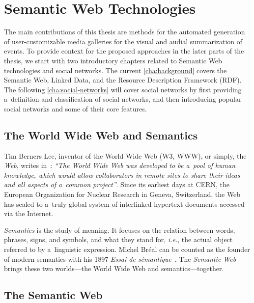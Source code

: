 \chapter{Semantic Web Technologies}
\label{cha:background}

\ifpdf
    \graphicspath{{2_background/figures/PNG/}{2_background/figures/PDF/}{2_background/figures/}}
\else
    \graphicspath{{2_background/figures/EPS/}{2_background/figures/}}
\fi

The main contributions of this thesis
are methods for the automated generation of
user-customizable media galleries
for the visual and audial summarization of events.
To provide context for the proposed approaches
in the later parts of the thesis,
we start with two introductory chapters
related to Semantic Web technologies
and social networks.
The current \autoref{cha:background} covers
the Semantic Web, Linked Data,
and the Resource Description Framework (RDF).
The following \autoref{cha:social-networks}
will cover social networks
by first providing a~definition
and classification of social networks,
and then introducing popular social networks
and some of their core features.

\section{The World Wide Web and Semantics}

Tim Berners Lee, inventor of the World Wide Web (W3, WWW),
or simply, the \emph{Web},
writes in~\cite{bernerslee1994worldwideweb}:
\textit{``The World Wide Web was developed
to be a~pool of human knowledge,
which would allow collaborators
in remote sites to share their ideas
and all aspects of a~common project''}.
Since its earliest days at CERN,
the European Organization for Nuclear Research
in Geneva, Switzerland,
the Web has scaled to a~truly global system
of interlinked hypertext documents
accessed via the Internet.

\emph{Semantics} is the study of meaning.
It focuses on the relation between
words, phrases, signs, and symbols,
and what they stand for, \emph{i.e.},
the actual object referred to by a~linguistic expression.
Michel Bréal can be counted as the founder
of modern semantics with his 1897
\emph{Essai de sémantique}~\cite{breal1897essai}.
The \emph{Semantic Web} brings these two worlds---the
World Wide Web and semantics---together.

\section{The Semantic Web}

